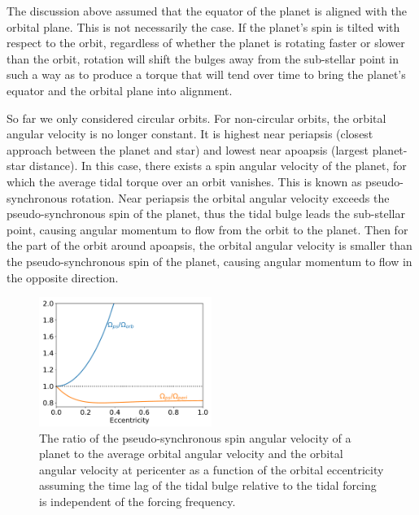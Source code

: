 The discussion above assumed that the equator of the planet is aligned with the
orbital plane. This is not necessarily the case. If the planet's spin is tilted
with respect to the orbit, regardless of whether the planet is rotating faster
or slower than the orbit, rotation will shift the bulges away from the
sub-stellar point in such a way as to produce a torque that will tend over time
to bring the planet's equator and the orbital plane into alignment.

So far we only considered circular orbits. For non-circular orbits, the orbital
angular velocity is no longer constant. It is highest near periapsis (closest
approach between the planet and star) and lowest near apoapsis (largest
planet-star distance). In this case, there exists a spin angular velocity of the
planet, for which the average tidal torque over an orbit vanishes. This is known
as pseudo-synchronous rotation. Near periapsis the orbital angular velocity
exceeds the pseudo-synchronous spin of the planet, thus the tidal bulge leads
the sub-stellar point, causing angular momentum to flow from the orbit to the
planet. Then for the part of the orbit around apoapsis, the orbital angular
velocity is smaller than the pseudo-synchronous spin of the planet, causing
angular momentum to flow in the opposite direction.

\begin{figure}[t]
%
    \centering
%
    \includegraphics[width=0.5\textwidth]{pseudosync_spin.pdf}
%
    \caption{
%
        The ratio of the pseudo-synchronous spin angular velocity of a planet to
        the average orbital angular velocity and the orbital angular velocity at
        pericenter as a function of the orbital eccentricity assuming the time
        lag of the tidal bulge relative to the tidal forcing is independent of
        the forcing frequency.
%
    }
%
    \label{fig:pseudo-synchronous}
%
\end{figure}


